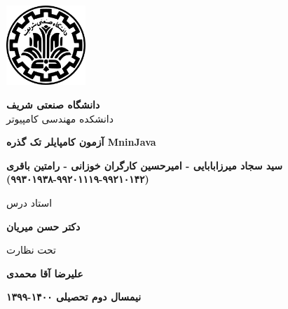 \thispagestyle{empty}
\begin{center}
\includegraphics[height=3cm]{sut_logo.png}
\vspace{0.4cm}

{\large
	\textbf{دانشگاه صنعتی شریف}\\
	دانشکده مهندسی کامپیوتر
}
\vspace{3.5cm}

{\LARGE
	\textbf{آزمون کامپایلر تک گذره MninJava}\\
}
\vspace{3.5cm}

{\Large
	\textbf{سید سجاد میرزابابایی - امیرحسین کارگران خوزانی - رامتین باقری (٩٩٢١٠١۴٢-۹۹۲۰۱۱۱۹-۹۹۳۰۱۹۳۸)}\\
}
\vspace{2.5cm}

{\large
	استاد درس\\
}
\vspace{0.5cm}

{\Large
	\textbf{دکتر حسن میریان}\\
}
\vspace{0.5cm}

{\large
	تحت نظارت\\
}
\vspace{0.5cm}

{\Large
	\textbf{علیرضا آقا محمدی}\\
}
\vspace{3cm}


{\Large
	\textbf{نیمسال دوم تحصیلی ۱۴۰۰-۱۳۹۹}
}

\end{center}
\restoregeometry
\pagebreak

%
%
%	
%


